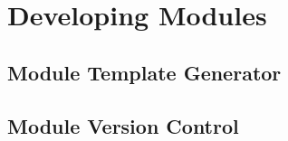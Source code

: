 \documentclass[12pt]{article}
\begin{document}
\section{Developing Modules}
\label{sec-developing-new-modules}

\subsection{Module Template Generator}
\label{subsec-template-generator}

\subsection{Module Version Control}
\label{subsec-module-version-control}

\newpage



% 
% 

\end{document}
